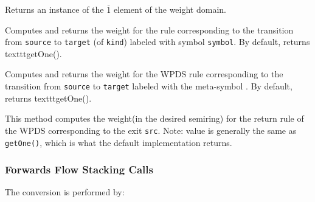 \begin{functionlist} 
  \functionitem[\texttt{sem\_elem\_t getOne() const = 0}]  \nopagebreak
    Returns an instance of the $\bar{1}$ element of the weight domain.

    \nopagebreak
    Computes and returns the weight for the rule corresponding to the
    transition from \texttt{source} to \texttt{target} (of
    \texttt{kind})
    labeled with symbol \texttt{symbol}. By default, returns texttt{getOne()}.

    \nopagebreak
    Computes and returns the weight for the WPDS rule corresponding to the
    transition from \texttt{source} to \texttt{target} labeled with the
    meta-symbol \wild. By default, returns texttt{getOne()}.

  This method computes the weight(in the desired semiring) for the return rule of
  the WPDS corresponding to the exit \texttt{src}.
  Note: value is generally the same as \texttt{getOne()}, which is what the
  default implementation returns.

\end{functionlist}


\subsubsection{Forwards Flow Stacking Calls}
\label{Se:wpds-forwards-flow-stacking-calls}

\noindent The conversion is performed by:



